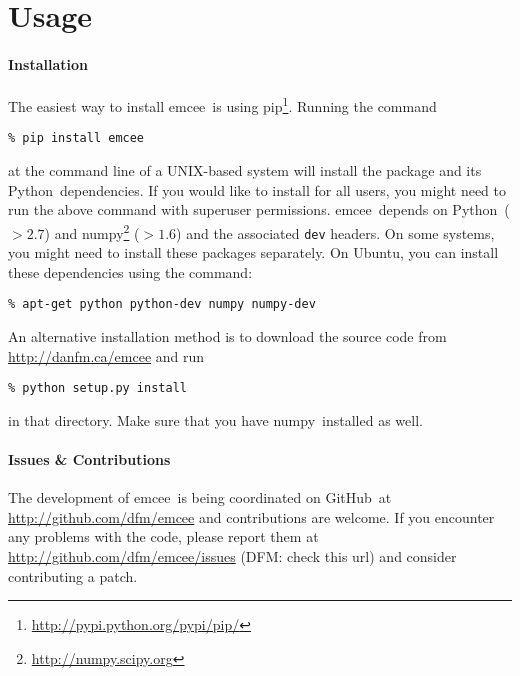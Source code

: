 \documentclass[12pt,preprint]{aastex}
\newcommand{\project}[1]{{\sffamily #1}}
\newcommand{\Python}{\project{Python}}
\newcommand{\numpy}{\project{numpy}}
\newcommand{\Ubuntu}{\project{Ubuntu}}
\newcommand{\github}{\project{GitHub}}
\newcommand{\pip}{\project{pip}}
\newcommand{\thisplain}{emcee}
\newcommand{\this}{\project{\thisplain}}
\newcommand{\sectlabel}[1]{\label{sect:#1}}
\begin{document}
\appendix

\section{Usage}\sectlabel{api}

\paragraph{Installation}

The easiest way to install \this~is using
\pip\footnote{\url{http://pypi.python.org/pypi/pip/}}. Running the command
\begin{lstlisting}
% pip install emcee
\end{lstlisting}
at the command line of a UNIX-based system will install the package and its
\Python~dependencies. If you would like to install for all users, you might
need to run the above command with superuser permissions. \this~depends on
\Python~($>2.7$) and \numpy\footnote{\url{http://numpy.scipy.org}} ($>1.6$)
and the associated \texttt{dev} headers. On some systems, you might need to
install these packages separately. On \Ubuntu, you can install these
dependencies using the command:
\begin{lstlisting}
% apt-get python python-dev numpy numpy-dev
\end{lstlisting}

An alternative installation method is to download the source code from
\url{http://danfm.ca/emcee} and run
\begin{lstlisting}
% python setup.py install
\end{lstlisting}
in that directory. Make sure that you have \numpy~installed as well.

\paragraph{Issues \& Contributions}

The development of \this~is being coordinated on \github~at
\url{http://github.com/dfm/emcee} and contributions are welcome. If you
encounter any problems with the code, please report them at
\url{http://github.com/dfm/emcee/issues} (DFM: check this url) and consider
contributing a patch.
\end{document}
